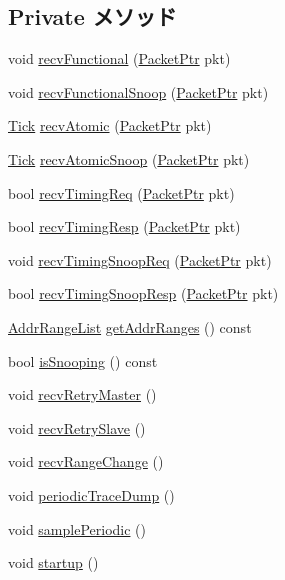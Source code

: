 \subsection*{Private メソッド}
\begin{DoxyCompactItemize}
\item 
void \hyperlink{classCommMonitor_aeefa907fb6d6a787e6dab90e8138ea90}{recvFunctional} (\hyperlink{classPacket}{PacketPtr} pkt)
\item 
void \hyperlink{classCommMonitor_a284dfb90c168233c9d416bc07de8fefe}{recvFunctionalSnoop} (\hyperlink{classPacket}{PacketPtr} pkt)
\item 
\hyperlink{base_2types_8hh_a5c8ed81b7d238c9083e1037ba6d61643}{Tick} \hyperlink{classCommMonitor_a5f0b4c4a94f6b0053f9d7a4eb9c2518a}{recvAtomic} (\hyperlink{classPacket}{PacketPtr} pkt)
\item 
\hyperlink{base_2types_8hh_a5c8ed81b7d238c9083e1037ba6d61643}{Tick} \hyperlink{classCommMonitor_a886d584c81ee4e398ff8069907f6e1a5}{recvAtomicSnoop} (\hyperlink{classPacket}{PacketPtr} pkt)
\item 
bool \hyperlink{classCommMonitor_a3344d9dd0f83257feab5424e761f31c6}{recvTimingReq} (\hyperlink{classPacket}{PacketPtr} pkt)
\item 
bool \hyperlink{classCommMonitor_a482dba5588f4bee43e498875a61e5e0b}{recvTimingResp} (\hyperlink{classPacket}{PacketPtr} pkt)
\item 
void \hyperlink{classCommMonitor_aff3031c56fc4947a19695c868bb8233e}{recvTimingSnoopReq} (\hyperlink{classPacket}{PacketPtr} pkt)
\item 
bool \hyperlink{classCommMonitor_a9b643d565edc21dac11ce15a560238a7}{recvTimingSnoopResp} (\hyperlink{classPacket}{PacketPtr} pkt)
\item 
\hyperlink{classstd_1_1list}{AddrRangeList} \hyperlink{classCommMonitor_a36cf113d5e5e091ebddb32306c098fae}{getAddrRanges} () const 
\item 
bool \hyperlink{classCommMonitor_a5ce11b7a254d3cb756d94568f7cbc25d}{isSnooping} () const 
\item 
void \hyperlink{classCommMonitor_a74fc0d5bf99b08c9899269e3dd7fab6a}{recvRetryMaster} ()
\item 
void \hyperlink{classCommMonitor_a2292f62803fe220e9629886f24aae91a}{recvRetrySlave} ()
\item 
void \hyperlink{classCommMonitor_aecf310a01b533ae8700eccac2cf20480}{recvRangeChange} ()
\item 
void \hyperlink{classCommMonitor_a31e31032fcf23dfbf54cf733a71c87a3}{periodicTraceDump} ()
\item 
void \hyperlink{classCommMonitor_a8d8196ff6539b2e3b6deb4ae81156fc6}{samplePeriodic} ()
\item 
void \hyperlink{classCommMonitor_aecc7d8debf54990ffeaaed5bac7d7d81}{startup} ()
\end{DoxyCompactItemize}
